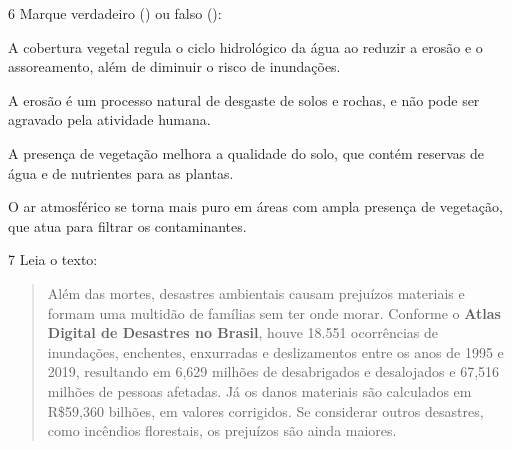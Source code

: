 \num{6} Marque verdadeiro () ou falso ():

\begin{boxlist}
\item A cobertura vegetal regula o ciclo hidrológico da água ao reduzir 
a erosão e o assoreamento, além de diminuir o risco de inundações. 

\item A erosão é um processo natural de desgaste de solos e rochas, e 
não pode ser agravado pela atividade humana. 

\item A presença de vegetação melhora a qualidade do solo, que contém 
reservas de água e de nutrientes para as plantas. 

\item O ar atmosférico se torna mais puro em áreas com ampla presença de 
vegetação, que atua para filtrar os contaminantes. 
\end{boxlist}


\num{7} Leia o texto:

\begin{quote}
Além das mortes, desastres ambientais causam prejuízos materiais e
formam uma multidão de famílias sem ter onde morar. Conforme o
\textbf{Atlas Digital de Desastres no Brasil}, houve 18.551 ocorrências
de inundações, enchentes, enxurradas e deslizamentos entre os anos de
1995 e 2019, resultando em 6,629 milhões de desabrigados e desalojados e
67,516 milhões de pessoas afetadas. Já os danos materiais são calculados
em R\$59,360 bilhões, em valores corrigidos. Se considerar outros
desastres, como incêndios florestais, os prejuízos são ainda maiores.

\end{quote}

